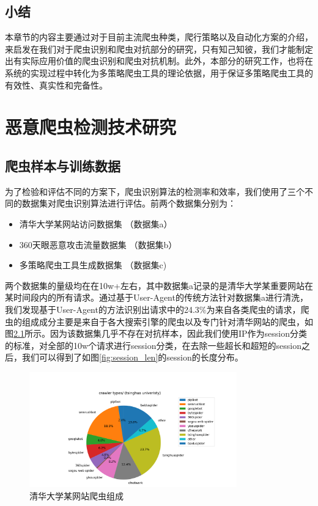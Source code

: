 \documentclass[doctor,privacy,twoside]{buaa_mac}
\begin{document}
\section{小结}
本章节的内容主要通过对于目前主流爬虫种类，爬行策略以及自动化方案的介绍，来启发在我们对于爬虫识别和爬虫对抗部分的研究，只有知己知彼，我们才能制定出有实际应用价值的爬虫识别和爬虫对抗机制。此外，本部分的研究工作，也将在系统的实现过程中转化为多策略爬虫工具的理论依据，用于保证多策略爬虫工具的有效性、真实性和完备性。



\chapter{恶意爬虫检测技术研究}

\section{爬虫样本与训练数据}
为了检验和评估不同的方案下，爬虫识别算法的检测率和效率，我们使用了三个不同的数据集对爬虫识别算法进行评估。前两个数据集分别为：
\begin{itemize}
\item 清华大学某网站访问数据集 （数据集a）
\item 360天眼恶意攻击流量数据集 （数据集b）
\item 多策略爬虫工具生成数据集 （数据集c)
\end{itemize}

两个数据集的量级均在在10w+左右，其中数据集a记录的是清华大学某重要网站在某时间段内的所有请求。通过基于User-Agent的传统方法针对数据集a进行清洗，我们发现基于User-Agent的方法识别出请求中的24.3\%为来自各类爬虫的请求，爬虫的组成成分主要是来自于各大搜索引擎的爬虫以及专门针对清华网站的爬虫，如图\ref{fig:crawlers}所示。因为该数据集几乎不存在对抗样本，因此我们使用IP作为session分类的标准，对全部的10w个请求进行session分类，在去除一些超长和超短的session之后，我们可以得到了如图\ref{fig:session_len}的session的长度分布。

\centerline{}
\begin{figure}[!h]
  \centering
  \includegraphics[width=0.8\textwidth]{images/THU_crawler_types.png}
  \caption{清华大学某网站爬虫组成}
  \label{fig:crawlers}
\end{figure}
\centerline{}
\end{document}
